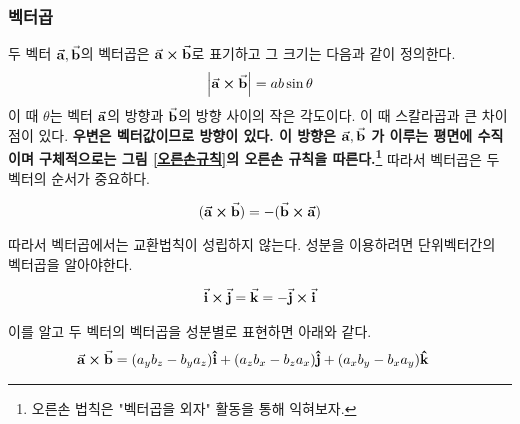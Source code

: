 \begin{flushleft}
\subsubsection{벡터곱} 
  두 벡터 $\va{a}, \va{b}$의 벡터곱은 $\va{a}\cp\va{b}$로 표기하고 그 크기는 다음과 같이 정의한다. 
\begin{equation}
  \abs{\va{a}\cp\va{b}}=ab\sin\theta
\end{equation}
이 때 $\theta$는 벡터 $\va{a}$의 방향과 $\va{b}$의 방향 사이의 작은 각도이다. 이 때 스칼라곱과 큰 차이점이 있다.
\textbf{우변은 벡터값이므로 방향이 있다. 이 방향은 $\va{a},\va{b}$
가 이루는 평면에 수직이며 구체적으로는 그림                                                                                                                                                                                                                                                                                                                                                                                                                                                                                                                                                                                                                                                    \ref{오른손규칙}의 오른손 규칙을 따른다.\footnote{오른손 법칙은 "벡터곱을 외자" 활동을 통해 익혀보자.}}
 따라서 벡터곱은 두 벡터의 순서가 중요하다. 

\begin{equation}
  (\va{a}\cp\va{b})=  -(\va{b}\cp\va{a})
\end{equation}

따라서 벡터곱에서는 교환법칙이 성립하지 않는다.
성분을 이용하려면 단위벡터간의 벡터곱을 알아야한다. 

\begin{equation}
  \begin{split}
    \va{i}\cp\va{j}=\va{k}=-\va{j}\cp\va{i}
  \end{split}
\end{equation}



이를 알고 두 벡터의 벡터곱을 성분별로 표현하면 아래와 같다.
\begin{equation}
  \begin{split}
    \va{a}\cp\va{b}&= (a_y b_z-b_y a_z)\vu{i}+(a_z b_x - b_z a_x)\vu{j}+(a_x
    b_y-b_x a_y)\vu{k} 
  \end{split}
\end{equation}


\end{flushleft}
